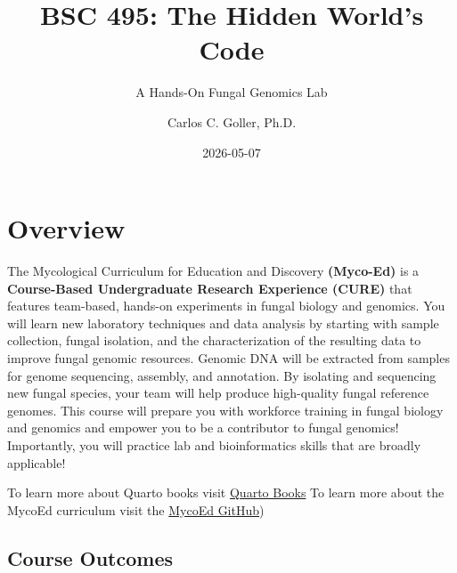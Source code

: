 \documentclass[
  letterpaper,
  DIV=11,
  numbers=noendperiod]{scrreprt}
\title{BSC 495: The Hidden World's Code}
\subtitle{A Hands-On Fungal Genomics Lab}
\author{Carlos C. Goller, Ph.D.}
\date{2026-05-07}
\renewcommand*\contentsname{Table of contents}
\newcommand\contentsname{Table of contents}
\begin{document}
\maketitle

\renewcommand*\contentsname{Table of contents}
{
\setcounter{tocdepth}{2}
\tableofcontents
}


\chapter*{Overview}\label{overview}


The Mycological Curriculum for Education and Discovery
\textbf{(Myco-Ed)} is a \textbf{Course-Based Undergraduate Research
Experience (CURE)} that features team-based, hands-on experiments in
fungal biology and genomics. You will learn new laboratory techniques
and data analysis by starting with sample collection, fungal isolation,
and the characterization of the resulting data to improve fungal genomic
resources. Genomic DNA will be extracted from samples for genome
sequencing, assembly, and annotation. By isolating and sequencing new
fungal species, your team will help produce high-quality fungal
reference genomes. This course will prepare you with workforce training
in fungal biology and genomics and empower you to be a contributor to
fungal genomics! Importantly, you will practice lab and bioinformatics
skills that are broadly applicable!

To learn more about Quarto books visit
\href{https://quarto.org/docs/books}{Quarto Books} To learn more about
the MycoEd curriculum visit the
\href{https://mycocosm.jgi.doe.gov/mycocosm/home/myco-ed}{MycoEd
GitHub})

\section*{Course Outcomes}\label{course-outcomes}

\end{document}
